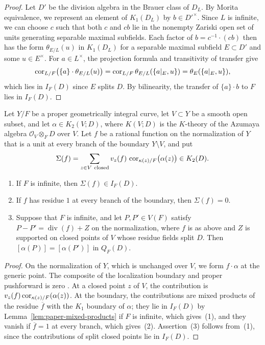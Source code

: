 \begin{proof}
Let $D'$ be the division algebra in the Brauer class of $D_L$.
By Morita equivalence, we represent an element of $K_1(D_L)$ by $b\in D'^\times$.
Since $L$ is infinite, we can choose $c$ such that both $c$ and $cb$ lie in the nonempty Zariski open set of units generating separable maximal subfields.
Each factor of $b=c^{-1}\cdot(cb)$ then has the form $\theta_{E/L}(u)$ in $K_1(D_L)$ for a separable maximal subfield $E\subset D'$ and some $u\in E^\times$.
For $a\in L^\times$, the projection formula and transitivity of transfer give
\[
 \operatorname{cor}_{L/F}\bigl(\{a\}\cdot\theta_{E/L}(u)\bigr)
 =\operatorname{cor}_{L/F}\theta_{E/L}(\{a|_E,u\})=\theta_E(\{a|_E,u\}),
\]
which lies in $I_F(D)$ since $E$ splits $D$.
By bilinearity, the transfer of $\{a\}\cdot b$ to $F$ lies in $I_F(D)$.
\end{proof}

\begin{lemma}\label{lem:paper-curve-reciprocity}
Let $Y/F$ be a proper geometrically integral curve, let $V\subset Y$ be a smooth open subset, and let $\alpha\in K_2(V;D)$, where $K(V;D)$ is the $K$-theory of the Azumaya algebra $\mathcal O_V\otimes_FD$ over $V$.
Let $f$ be a rational function on the normalization of $Y$ that is a unit at every branch of the boundary $Y\setminus V$, and put
\[
 \Sigma(f)=\sum_{z\in V\ \mathrm{closed}}v_z(f)\,\cor_{\kappa(z)/F}\bigl(\alpha(z)\bigr)\in K_2(D).
\]
\begin{enumerate}
\item If $F$ is infinite, then $\Sigma(f)\in I_F(D)$.
\item If $f$ has residue $1$ at every branch of the boundary, then $\Sigma(f)=0$.
\item Suppose that $F$ is infinite, and let $P,P'\in V(F)$ satisfy $P-P'=\operatorname{div}(f)+Z$ on the normalization, where $f$ is as above and $Z$ is supported on closed points of $V$ whose residue fields split $D$.
Then $[\alpha(P)]=[\alpha(P')]$ in $Q_F(D)$.
\end{enumerate}
\end{lemma}
\begin{proof}
On the normalization of $Y$, which is unchanged over $V$, we form $f\cdot\alpha$ at the generic point.
The composite of the localization boundary and proper pushforward is zero \cite{QuillenHigher}.
At a closed point $z$ of $V$, the contribution is $v_z(f)\operatorname{cor}_{\kappa(z)/F}(\alpha(z))$.
At the boundary, the contributions are mixed products of the residue $\overline f$ with the $K_1$ boundary of $\alpha$; they lie in $I_F(D)$ by Lemma~\ref{lem:paper-mixed-products} if $F$ is infinite, which gives~(1), and they vanish if $\overline f=1$ at every branch, which gives~(2).
Assertion~(3) follows from~(1), since the contributions of split closed points lie in $I_F(D)$.
\end{proof}

